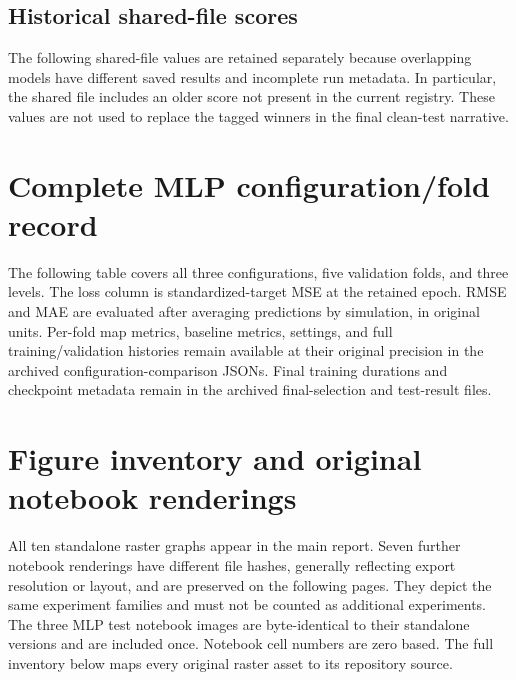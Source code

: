 \documentclass[11pt,a4paper]{article}
\newcommand{\model}[1]{\texttt{\detokenize{#1}}}
\begin{document}




\subsection{Historical shared-file scores}
The following shared-file values are retained separately because overlapping models have different saved results and incomplete run metadata. In particular, the shared file includes an older \model{model_1} score not present in the current registry. These values are not used to replace the tagged winners in the final clean-test narrative.


\clearpage
\section{Complete MLP configuration/fold record}
\label{app:mlp}
The following table covers all three configurations, five validation folds, and three levels. The loss column is standardized-target MSE at the retained epoch. RMSE and MAE are evaluated after averaging predictions by simulation, in original units. Per-fold map metrics, baseline metrics, settings, and full training/validation histories remain available at their original precision in the archived configuration-comparison JSONs. Final training durations and checkpoint metadata remain in the archived final-selection and test-result files.


\clearpage
\section{Figure inventory and original notebook renderings}
\label{app:figures}
All ten standalone raster graphs appear in the main report. Seven further notebook renderings have different file hashes, generally reflecting export resolution or layout, and are preserved on the following pages. They depict the same experiment families and must not be counted as additional experiments. The three MLP test notebook images are byte-identical to their standalone versions and are included once. Notebook cell numbers are zero based. The full inventory below maps every original raster asset to its repository source.

\clearpage

\end{document}
